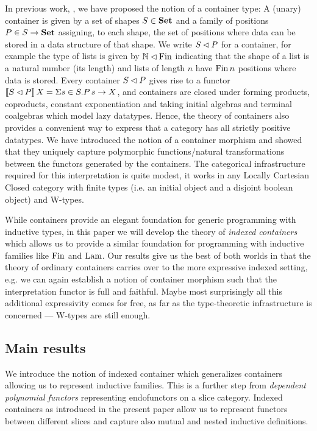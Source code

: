 \documentclass[10pt, conference, compsocconf]{IEEEtran}
\begin{document}
In previous
work, \cite{alti:cont-tcs,alti:fossacs03}, we have proposed the notion of a container
type: A (unary) container is given by a set of shapes $S\in\mathbf{Set}$ and a
family of positions $P\in S\to\mathbf{Set}$ assigning, to each shape, the set
of positions where data can be stored in a data structure of that
shape. We write $S \lhd P$ for a container, for example the type of lists
is given by $\mathbb{N} \lhd \mathrm{Fin}$ indicating that the shape of a list is
a natural number (its length) and lists of length $n$ have $\mathrm{Fin}\,n$
positions where data is stored. Every container $S \lhd P$ gives rise to a
functor $\llbracket S \lhd P \rrbracket\, X = \Sigma s\in S.P\,s \to X$, and containers are closed under forming products, coproducts,
constant exponentiation and taking initial algebras and terminal
coalgebras which model lazy datatypes. Hence, the theory of containers
also provides a convenient way to express that a category has all
strictly positive datatypes.  We have introduced the notion of a
container morphism and showed that they uniquely capture polymorphic
functions/natural transformations between the functors generated by
the containers. The categorical infrastructure required for this interpretation is
quite modest, it works in any Locally Cartesian Closed category with
finite types (i.e.  an initial object and a disjoint boolean object)
and W-types.

While containers provide an elegant foundation for generic programming
with inductive types, in this paper we will develop the theory of
\emph{indexed containers} which allows us to provide a similar
foundation for programming with inductive families like $\mathrm{Fin}$ and
$\mathrm{Lam}$. Our results give us the best of both worlds in that the theory
of ordinary containers carries over to the more expressive indexed
setting, e.g. we can again establish a notion of container morphism
such that the interpretation functor is full and faithful. Maybe most
surprisingly all this additional expressivity comes for free, as far
as the type-theoretic infrastructure is concerned --- W-types are
still enough.

\subsection*{Main results}

\noindent We introduce the notion of indexed container which
generalizes containers allowing us to represent inductive
families. This is a further step from \emph{dependent polynomial
  functors} \cite{HylandGambino} representing endofunctors on a slice
category. Indexed containers as introduced in the present paper allow us
to represent functors between different slices and capture also mutual
and nested inductive definitions.
\end{document}
